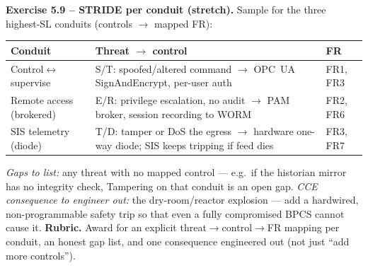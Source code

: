 \documentclass[11pt,a4paper]{article}
\begin{document}
\begin{solutionbox}
\textbf{Exercise 5.9 -- STRIDE per conduit (stretch).}
Sample for the three highest-SL conduits (controls $\to$ mapped FR):
\renewcommand{\arraystretch}{1.15}
\footnotesize
\par\begin{tabular}{|p{2.9cm}|p{5.0cm}|p{5.0cm}|}
\hline
\textbf{Conduit} & \textbf{Threat $\to$ control} & \textbf{FR} \\
\hline
Control$\leftrightarrow$supervise & S/T: spoofed/altered command $\to$ OPC~UA SignAndEncrypt, per-user auth & FR1, FR3 \\
Remote access (brokered) & E/R: privilege escalation, no audit $\to$ PAM broker, session recording to WORM & FR2, FR6 \\
SIS telemetry (diode) & T/D: tamper or DoS the egress $\to$ hardware one-way diode; SIS keeps tripping if feed dies & FR3, FR7 \\
\hline
\end{tabular}
\par\vspace{2mm}
\noindent \emph{Gaps to list:} any threat with no mapped control --- e.g.\ if the historian mirror has no integrity check, Tampering on that conduit is an open gap. \emph{CCE consequence to engineer out:} the dry-room/reactor explosion --- add a hardwired, non-programmable safety trip so that even a fully compromised BPCS cannot cause it. \textbf{Rubric.} Award for an explicit threat$\to$control$\to$FR mapping per conduit, an honest gap list, and one consequence engineered out (not just ``add more controls'').
\end{solutionbox}
\end{document}

